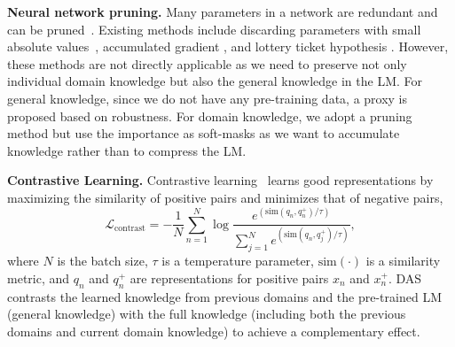 \documentclass{article} \usepackage{iclr2023_conference,times}
\begin{document}
\noindent
\textbf{Neural network pruning.}
Many parameters in a network are redundant and can be pruned~\citep{li2021differentiable,lai2021parp,michel2019sixteen,voita2019analyzing}. 
Existing methods include discarding parameters with small absolute values~\citep{han2015learning,guo2016dynamic}, accumulated gradient \citep{michel2019sixteen}, and lottery ticket hypothesis \citep{brix-etal-2020-successfully}. However, these methods are not directly applicable as  we need to preserve not only individual domain knowledge but also the general knowledge in the LM. For general knowledge, since we do not have any pre-training data, a proxy is proposed based on robustness.  For domain knowledge, we adopt a pruning method but use the importance as soft-masks as we want to accumulate knowledge rather than to compress the LM. 


\textbf{Contrastive Learning.} 
Contrastive learning~\citep{chen2020simple,he2020momentum} learns good representations by maximizing the similarity of positive pairs and minimizes that of negative pairs, {\color{black}
\begin{equation}
\label{eq.relate_contrast}
    \mathcal{L}_{\text{contrast}} = -\frac{1}{N}\sum_{n=1}^{N}\log\frac{e^{(\text{sim}(q_n, q^+_n)/\tau)}}{\sum_{j=1}^{N}e^{(\text{sim}(q_n,q^+_j)/\tau)}},
\end{equation}
}
where $N$ is the batch size, $\tau$ is a temperature parameter, $\text{sim}(\cdot)$ is a similarity metric, and $q_n$ and $q^+_n$ are representations for positive pairs $x_n$ and $x_n^+$. DAS contrasts the learned knowledge from previous domains and the pre-trained LM (general knowledge) with the full knowledge (including both the previous domains and current domain knowledge) to achieve a complementary effect. 
\end{document}
